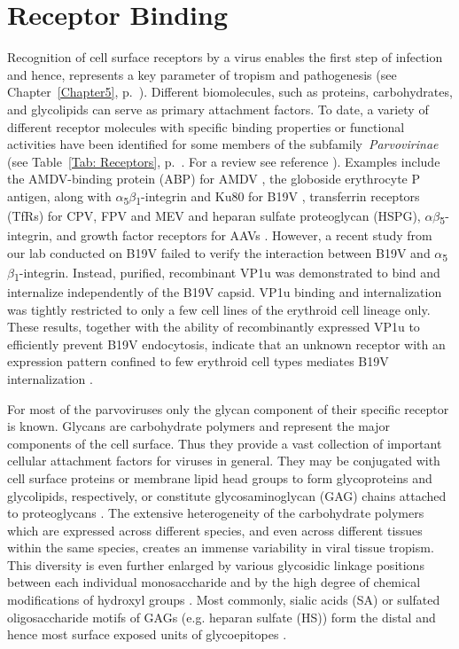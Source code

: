 \section{Receptor Binding}
\label{Binding}
Recognition of cell surface receptors by a virus enables the first step of infection and hence, represents a key parameter of tropism and pathogenesis (see Chapter~\ref{Chapter5}, p.~\pageref{Chapter5}). Different biomolecules, such as proteins, carbohydrates, and glycolipids can serve as primary attachment factors. To date, a variety of different receptor molecules with specific binding properties or functional activities have been identified for some members of the subfamily~\textit{Parvovirinae} (see Table~\ref{Tab: Receptors}, p.~\pageref{Tab: Receptors}. For a review see reference \cite{Receptor}). Examples include the AMDV-binding protein (ABP) for AMDV \cite{pmid10196278}, the globoside erythrocyte P antigen, along with $\alpha$\textsubscript{5}$\beta$\textsubscript{1}-integrin and Ku80 for B19V \cite{pmid8211117, pmid15661151, pmid12907437, pmid16076874, weigel}, transferrin receptors (TfRs) for CPV, FPV and MEV \cite{pmid16040076, pmid11264378} and heparan sulfate proteoglycan (HSPG), $\alpha$\textsubscript{}$\beta$\textsubscript{5}-integrin, and growth factor receptors for AAVs \cite{pmid14502277, pmid15596854, pmid9883842, pmid9445046, pmid9883843, pmid8599196}. However, a recent study from our lab conducted on B19V failed to verify the interaction between B19V and $\alpha$\textsubscript{5}$\beta$\textsubscript{1}-integrin. Instead, purified, recombinant VP1u was demonstrated to bind and internalize independently of the B19V capsid. VP1u binding and internalization was tightly restricted to only a few cell lines of the erythroid cell lineage only. These results, together with the ability of recombinantly expressed VP1u to efficiently prevent B19V endocytosis, indicate that an unknown receptor with an expression pattern confined to few erythroid cell types mediates B19V internalization \cite{pmid24067971}.  

For most of the parvoviruses only the glycan component of their specific receptor is known. Glycans are carbohydrate polymers and represent the major components of the cell surface. Thus they provide a vast collection of important cellular attachment factors for viruses in general. They may be conjugated with cell surface proteins or membrane lipid head groups to form glycoproteins and glycolipids, respectively, or constitute glycosaminoglycan (GAG) chains attached to proteoglycans \cite{pmid16019714}. The extensive heterogeneity of the carbohydrate polymers which are expressed across different species, and even across different tissues within the same species, creates an immense variability in viral tissue tropism. This diversity is even further enlarged by various glycosidic linkage positions between each individual monosaccharide and by the high degree of chemical modifications of hydroxyl groups \cite{pmid11841250, pmid17632542}. Most commonly, sialic acids (SA) or sulfated oligosaccharide motifs of GAGs (e.g. heparan sulfate (HS)) form the distal and hence most surface exposed units of glycoepitopes \cite{pmid17072005}.


